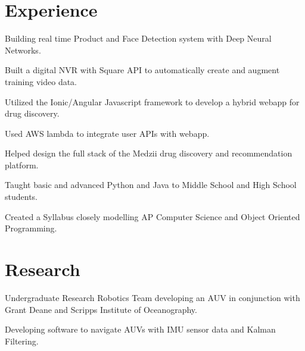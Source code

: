 \documentclass[]{deedy-resume-openfont}
\begin{document}
\begin{minipage}[t]{0.66\textwidth} 


\section{Experience}

\vspace{\topsep} %
\begin{tightemize}
\item Building real time Product and Face Detection system with Deep Neural Networks.
\item Built a digital NVR with Square API to automatically create and augment training video data.
\end{tightemize}
\sectionsep

\begin{tightemize}
\item Utilized the Ionic/Angular Javascript framework to develop a hybrid webapp for drug discovery.
\item Used AWS lambda to integrate user APIs with webapp.
\item Helped design the full stack of the Medzii drug discovery and recommendation platform.
\end{tightemize}
\sectionsep

\begin{tightemize}
\item Taught basic and advanced Python and Java to Middle School and High School students.
\item Created a Syllabus closely modelling AP Computer Science and Object Oriented Programming.
\end{tightemize}
\sectionsep


\section{Research}
\begin{tightemize}
\item Undergraduate Research Robotics Team developing an AUV in conjunction with Grant Deane and Scripps Institute of Oceanography.
\item Developing software to navigate AUVs with IMU sensor data and Kalman Filtering.
\end{tightemize}
\sectionsep


\end{minipage}
\end{document}

